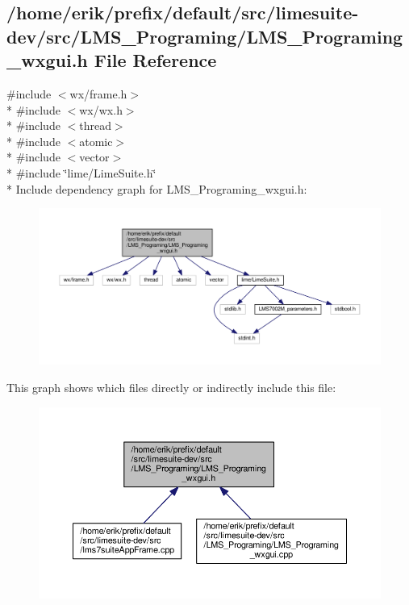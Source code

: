 \subsection{/home/erik/prefix/default/src/limesuite-\/dev/src/\+L\+M\+S\+\_\+\+Programing/\+L\+M\+S\+\_\+\+Programing\+\_\+wxgui.h File Reference}
\label{LMS__Programing__wxgui_8h}
{\ttfamily \#include $<$wx/frame.\+h$>$}\\*
{\ttfamily \#include $<$wx/wx.\+h$>$}\\*
{\ttfamily \#include $<$thread$>$}\\*
{\ttfamily \#include $<$atomic$>$}\\*
{\ttfamily \#include $<$vector$>$}\\*
{\ttfamily \#include \char`\"{}lime/\+Lime\+Suite.\+h\char`\"{}}\\*
Include dependency graph for L\+M\+S\+\_\+\+Programing\+\_\+wxgui.\+h\+:
\nopagebreak
\begin{figure}[H]
\begin{center}
\leavevmode
\includegraphics[width=350pt]{db/df9/LMS__Programing__wxgui_8h__incl}
\end{center}
\end{figure}
This graph shows which files directly or indirectly include this file\+:
\nopagebreak
\begin{figure}[H]
\begin{center}
\leavevmode
\includegraphics[width=350pt]{d8/d4c/LMS__Programing__wxgui_8h__dep__incl}
\end{center}
\end{figure}
